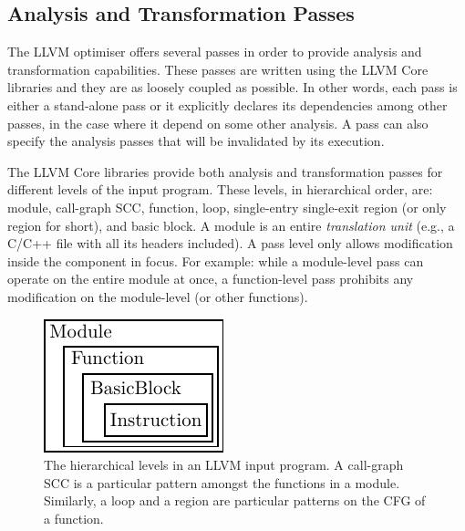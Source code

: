 \subsection{Analysis and Transformation Passes}

The LLVM optimiser offers several passes in order to provide analysis and transformation capabilities.
These passes are written using the LLVM Core libraries and they are as loosely coupled as possible.
In other words, each pass is either a stand-alone pass or it explicitly declares its dependencies among other passes, in the case where it depend on some other analysis.
A pass can also specify the analysis passes that will be invalidated by its execution.

The LLVM Core libraries provide both analysis and transformation passes for different levels of the input program.
These levels, in hierarchical order, are: module, call-graph SCC, function, loop, single-entry single-exit region (or only region for short), and basic block.
A module is an entire \textit{translation unit} (e.g., a C/C++ file with all its headers included).
A pass level only allows modification inside the component in focus.
For example: while a module-level pass can operate on the entire module at once,
a function-level pass prohibits any modification on the module-level (or other functions).

\begin{figure}[h]
  \centering
  \includegraphics[scale=1]{figs/llvm-containers.pdf}
  \caption{The hierarchical levels in an LLVM input program. A call-graph SCC is a particular pattern amongst the functions in a module.
Similarly, a loop and a region are particular patterns on the CFG of a function.}
  \label{fig:llvm-containers}
\end{figure}


